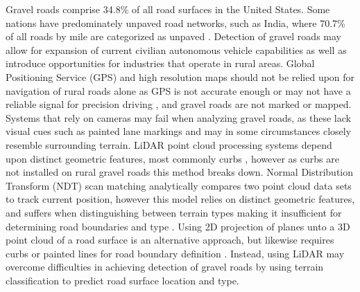 \documentclass[journal,onecolumn]{IEEEtran}
\begin{document}
	{Gravel roads comprise 34.8\% \cite{road_stats_2} of all road surfaces in the United States. Some nations have predominately unpaved road networks, such as India, where 70.7\% of all roads by mile are categorized as unpaved \cite{malik_lal_2019}. Detection of gravel roads may allow for expansion of current civilian autonomous vehicle capabilities as well as introduce opportunities for industries that operate in rural areas. Global Positioning Service (GPS) and high resolution maps should not be relied upon for navigation of rural roads alone as GPS is not accurate enough or may not have a reliable signal for precision driving \cite{noauthor_gpsgov_nodate}, and gravel roads are not marked or mapped. Systems that rely on cameras may fail when analyzing gravel roads, as these lack visual cues such as painted lane markings \cite{crisman_scarf_1993} and may in some circumstances closely resemble surrounding terrain. LiDAR point cloud processing systems depend upon distinct geometric features, most commonly curbs \cite{yadav_extraction_2017,liu_new_2013,qiu_fast_2016,fernandes_road_2014,seker_experiments_nodate,yang_semi-automated_2013,miyazaki_line-based_2014,hervieu_road_2013,smadja_road_nodate}, however as curbs are not installed on rural gravel roads \cite{skorseth_gravel_nodate} this method breaks down. Normal Distribution Transform (NDT) scan matching analytically compares two point cloud data sets to track current position, however this model relies on distinct geometric features, and suffers when distinguishing between terrain types making it insufficient for determining road boundaries and type \cite{biber_normal_2003}. Using 2D projection of planes unto a 3D point cloud of a road surface is an alternative approach, but likewise requires curbs or painted lines for road boundary definition \cite{fernandes_road_2014, borkar_robust_2009-1, guo_lane_2015}. Instead, using LiDAR may overcome difficulties in achieving detection of gravel roads by using terrain classification to predict road surface location and type.}
	
\end{document}
